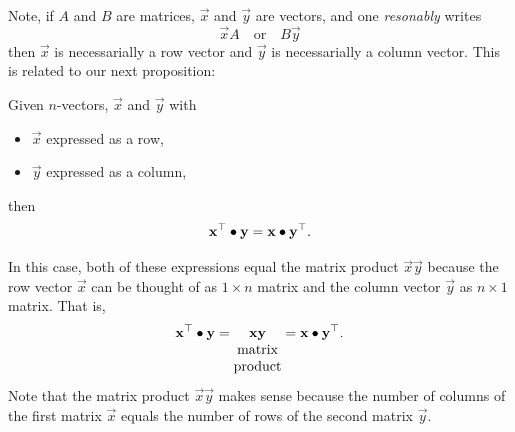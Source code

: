 \documentclass{ximera}
\begin{document}
Note, if $A$ and $B$ are matrices, $\vec{x}$ and $\vec{y}$ are
vectors, and one \textit{resonably} writes
\[
\vec x A\quad\text{or}\quad  B \vec y
\]
then $\vec{x}$ is necessarially a row vector and $\vec{y}$ is necessarially a column vector. This is related to our next proposition:


\begin{proposition}
  Given $n$-vectors, $\vec{x}$ and $\vec y$ with
  \begin{itemize}
  \item $\vec{x}$ expressed as a row,
  \item $\vec{y}$ expressed as a column,
  \end{itemize}
  then
  \[
    \mathbf{x}^\top\bullet \mathbf{y} = \mathbf{x}\bullet\mathbf{y}^\top.
  \]

  \begin{explanation}
    In this case, both of these expressions equal the matrix product
    $\vec{x} \vec{y}$ because the row vector $\vec{x}$ can be thought of
    as $1\times n$ matrix and the column vector $\vec{y}$ as
    $n \times 1$ matrix. That is,
    \[
      \mathbf{x}^\top\bullet \mathbf{y} = \underset{\begin{matrix}\text{matrix}\\\text{product}\end{matrix}}{\mathbf{x}\mathbf{y}} = \mathbf{x}\bullet\mathbf{y}^\top.
    \]
    Note that the matrix product $\vec{x} \vec{y}$ makes sense because
    the number of columns of the first matrix $\vec{x}$ equals the
    number of rows of the second matrix $\vec{y}$.
  \end{explanation}
\end{proposition}
\end{document}
